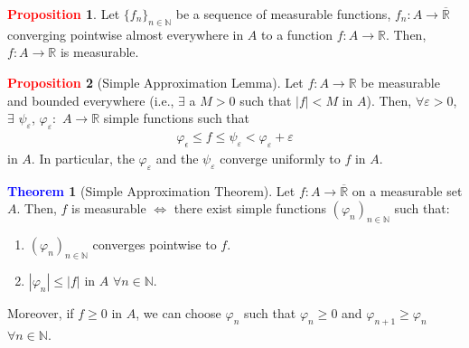 \documentclass[reqno,11pt]{amsart}
\theoremstyle{definition}
\newcommand{\bb}[1]{\mathbb{#1}}
\newtheorem{theorem}{\textcolor{blue}{Theorem}}
\theoremstyle{definition}
\newtheorem{prop}{\textcolor{red}{Proposition}}
\theoremstyle{remark}
\begin{document}
\begin{prop}
	Let $\{ f_n \}_{n \in \bb{N}}$ be a sequence of measurable functions, $f_n: A \rightarrow \overline{\bb{R}}$ converging pointwise almost everywhere in $A$ to a function $f: A \rightarrow \bb{R}$. Then, $f: A \rightarrow \bb{R}$ is measurable. 
\end{prop}

\begin{prop}[Simple Approximation Lemma]
	Let $f: A \rightarrow \bb{R}$ be measurable and bounded everywhere (i.e., $\exists$ a $M > 0$ such that $|f| < M $ in $A$). Then, $\forall \varepsilon > 0$, $\exists$ $\psi_\varepsilon$, $\varphi_\varepsilon:$ $A \rightarrow \bb{R}$ simple functions such that
	\begin{align*}
		\varphi_\epsilon \leq f \leq \psi_\varepsilon < \varphi_\varepsilon + \varepsilon	
	\end{align*}
	in $A$. In particular, the $\varphi_\varepsilon$ and the $\psi_\varepsilon$ converge uniformly to $f$ in $A$. 
\end{prop}

\begin{theorem}[Simple Approximation Theorem]
	Let $f: A \rightarrow \overline{\bb{R}}$ on a measurable set $A$. Then, $f$ is measurable $\iff$ there exist simple functions $(\varphi_n)_{n \in \bb{N}}$ such that: 
	\begin{enumerate}[noitemsep]
		\item $(\varphi_n)_{n \in \bb{N}}$ converges pointwise to $f$. 
		\item $|\varphi_n| \leq |f|$ in $A$ $\forall n \in \bb{N}$. 
	\end{enumerate}
	Moreover, if $f \geq 0$ in $A$, we can choose $\varphi_n$ such that $\varphi_n \geq 0$ and $\varphi_{n +1} \geq \varphi_n$ $\forall n \in \bb{N}$. 
\end{theorem}
\end{document}

